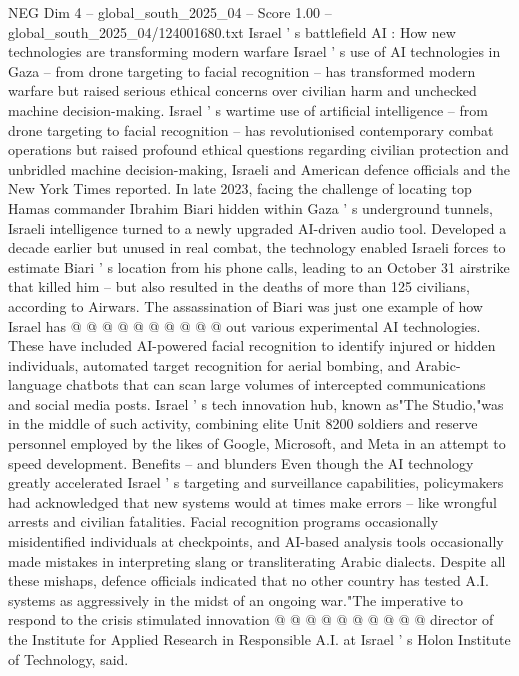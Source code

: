 \begin{textsample}{NEG Dim 4 – global\_south\_2025\_04 – Score 1.00 – global\_south\_2025\_04/124001680.txt}  \label{ex:f4_neg_240}
Israel ' s battlefield AI : How new technologies are transforming modern warfare Israel ' s use of AI technologies in Gaza -- from drone targeting to facial recognition -- has transformed modern warfare but raised serious ethical concerns over civilian harm and unchecked machine decision-making.
Israel ' s wartime use of artificial intelligence -- from drone targeting to facial recognition -- has revolutionised contemporary combat operations but raised profound ethical questions regarding civilian protection and unbridled machine decision-making, Israeli and American defence officials and the New York Times reported.
In late 2023, facing the challenge of locating top Hamas commander Ibrahim Biari hidden within Gaza ' s underground tunnels, Israeli intelligence turned to a newly upgraded AI-driven audio tool.
Developed a decade earlier but unused in real combat, the technology enabled Israeli forces to estimate Biari ' s location from his phone calls, leading to an October 31 airstrike that killed him -- but also resulted in the deaths of more than 125 civilians, according to Airwars.
The assassination of Biari was just one example of how Israel has @ @ @ @ @ @ @ @ @ @ out various experimental AI technologies.
These have included AI-powered facial recognition to identify injured or hidden individuals, automated target recognition for aerial bombing, and Arabic-language chatbots that can scan large volumes of intercepted communications and social media posts.
Israel ' s tech innovation hub, known as"The Studio,"was in the middle of such activity, combining elite Unit 8200 soldiers and reserve personnel employed by the likes of Google, Microsoft, and Meta in an attempt to speed development.
Benefits -- and blunders Even though the AI technology greatly accelerated Israel ' s targeting and surveillance capabilities, policymakers had acknowledged that new systems would at times make errors -- like wrongful arrests and civilian fatalities.
Facial recognition programs occasionally misidentified individuals at checkpoints, and AI-based analysis tools occasionally made mistakes in interpreting slang or transliterating Arabic dialects.
Despite all these mishaps, defence officials indicated that no other country has tested A.I. systems as aggressively in the midst of an ongoing war."The imperative to respond to the crisis stimulated innovation @ @ @ @ @ @ @ @ @ @ director of the Institute for Applied Research in Responsible A.I. at Israel ' s Holon Institute of Technology, said.

\end{textsample}
